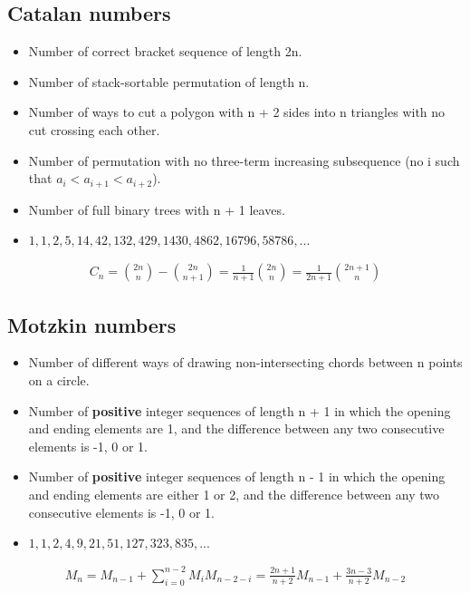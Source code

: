 \documentclass{article}
\begin{document}
\subsection{Catalan numbers}
\begin{itemize}
    \item Number of correct bracket sequence of length 2n.
    \item Number of stack-sortable permutation of length n.
    \item Number of ways to cut a polygon with n + 2 sides into n triangles with no cut crossing each other.
    \item Number of permutation with no three-term increasing subsequence (no i such that $a_i < a_{i + 1} < a_{i + 2}$).
    \item Number of full binary trees with n + 1 leaves.
    \item $1, 1, 2, 5, 14, 42, 132, 429, 1430, 4862, 16796, 58786, ...$
\end{itemize}
\begin{align*}
    C_n = \binom{2n}{n} - \binom{2n}{n+1} = \frac{1}{n+1} \binom{2n}{n} = \frac{1}{2n+1} \binom{2n+1}{n}
\end{align*}

\subsection{Motzkin numbers}
\begin{itemize}
    \item Number of different ways of drawing non-intersecting chords between n points on a circle.
    \item Number of \textbf{positive} integer sequences of length n + 1 in which the opening and ending elements are 1, and the difference between any two consecutive elements is -1, 0 or 1.
    \item Number of \textbf{positive} integer sequences of length n - 1 in which the opening and ending elements are either 1 or 2, and the difference between any two consecutive elements is -1, 0 or 1.
    \item $1, 1, 2, 4, 9, 21, 51, 127, 323, 835, ...$
\end{itemize}
\begin{align*}
    M_n = M_{n-1} + \sum_{i=0}^{n-2} M_i M_{n-2-i} = \frac{2n+1}{n+2} M_{n-1} + \frac{3n-3}{n+2} M_{n-2}
\end{align*}
\end{document}

